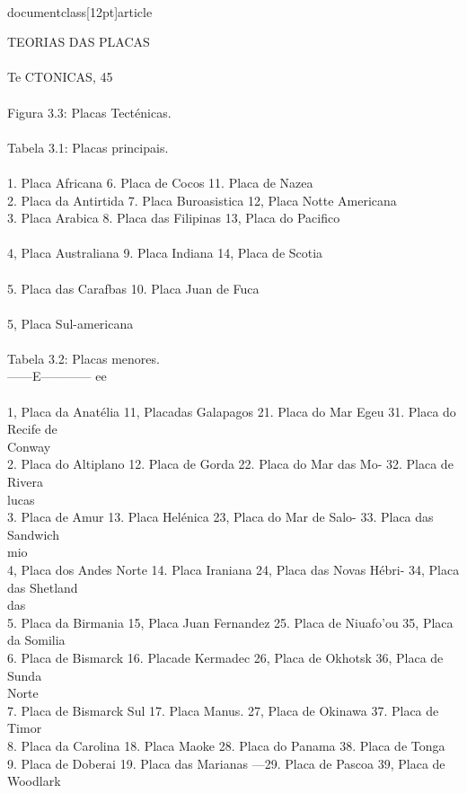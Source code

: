 \\documentclass[12pt]{article}
\begin{document}
TEORIAS DAS PLACAS\\
\\
Te CTONICAS, 45\\
\\
Figura 3.3: Placas Tecténicas.\\
\\
Tabela 3.1: Placas principais.\\
\\
1. Placa Africana 6. Placa de Cocos 11. Placa de Nazea\\
2. Placa da Antirtida 7. Placa Buroasistica 12, Placa Notte Americana\\
3. Placa Arabica 8. Placa das Filipinas 13, Placa do Pacifico\\
\\
4, Placa Australiana 9. Placa Indiana 14, Placa de Scotia\\
\\
5. Placa das Carafbas 10. Placa Juan de Fuca\\
\\
5, Placa Sul-americana\\
\\
Tabela 3.2: Placas menores.\\
——E———— ee\\
\\
1, Placa da Anatélia 11, Placadas Galapagos 21. Placa do Mar Egeu 31. Placa do Recife de\\
Conway\\
2. Placa do Altiplano 12. Placa de Gorda 22. Placa do Mar das Mo- 32. Placa de Rivera\\
lucas\\
3. Placa de Amur 13. Placa Helénica 23, Placa do Mar de Salo- 33. Placa das Sandwich\\
mio\\
4, Placa dos Andes Norte 14. Placa Iraniana 24, Placa das Novas Hébri- 34, Placa das Shetland\\
das\\
5. Placa da Birmania 15, Placa Juan Fernandez 25. Placa de Niuafo’ou 35, Placa da Somilia\\
6. Placa de Bismarck 16. Placade Kermadec 26, Placa de Okhotsk 36, Placa de Sunda\\
Norte\\
7. Placa de Bismarck Sul 17. Placa Manus. 27, Placa de Okinawa 37. Placa de Timor\\
8. Placa da Carolina 18. Placa Maoke 28. Placa do Panama 38. Placa de Tonga\\
9. Placa de Doberai 19. Placa das Marianas —29. Placa de Pascoa 39, Placa de Woodlark\\
\end{document}
